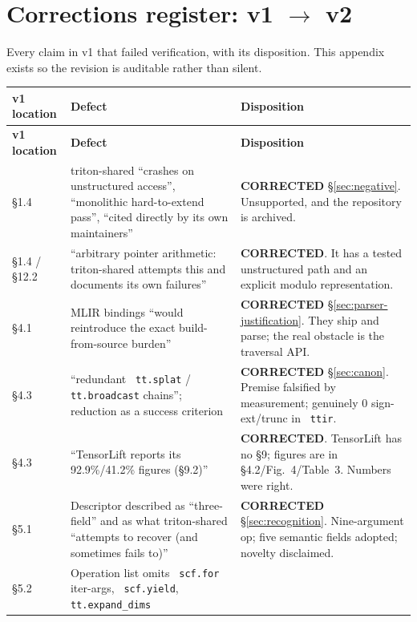\documentclass[11pt,a4paper]{article}
\newcommand{\code}[1]{\texttt{\small\hyphenchar\font=45 #1}}
\begin{document}
\section{Corrections register: v1 $\rightarrow$ v2}\label{app:corrections}

Every claim in v1 that failed verification, with its disposition. This appendix exists so the revision is
auditable rather than silent.

{\footnotesize
\begin{longtable}{@{}>{\raggedright\arraybackslash}p{2.4cm} >{\raggedright\arraybackslash}p{8.7cm} >{\raggedright\arraybackslash}p{4.2cm}@{}}
\toprule
\textbf{v1 location} & \textbf{Defect} & \textbf{Disposition} \\
\midrule
\endfirsthead
\toprule
\textbf{v1 location} & \textbf{Defect} & \textbf{Disposition} \\
\midrule
\endhead
\bottomrule
\endlastfoot
\S1.4 & triton-shared ``crashes on unstructured access'', ``monolithic hard-to-extend pass'',
``cited directly by its own maintainers'' & \textbf{CORRECTED} \S\ref{sec:negative}. Unsupported, and the
repository is archived. \\
\addlinespace
\S1.4 / \S12.2 & ``arbitrary pointer arithmetic: triton-shared attempts this and documents its own
failures'' & \textbf{CORRECTED}. It has a tested unstructured path and an explicit modulo representation. \\
\addlinespace
\S4.1 & MLIR bindings ``would reintroduce the exact build-from-source burden'' & \textbf{CORRECTED}
\S\ref{sec:parser-justification}. They ship and parse; the real obstacle is the traversal API. \\
\addlinespace
\S4.3 & ``redundant \code{tt.splat} / \code{tt.broadcast} chains''; reduction as a success criterion &
\textbf{CORRECTED} \S\ref{sec:canon}. Premise falsified by measurement; genuinely 0 sign-ext/trunc in
\code{ttir}. \\
\addlinespace
\S4.3 & ``TensorLift reports its 92.9\%/41.2\% figures (\S9.2)'' & \textbf{CORRECTED}. TensorLift has no
\S9; figures are in \S4.2/Fig.~4/Table~3. Numbers were right. \\
\addlinespace
\S5.1 & Descriptor described as ``three-field'' and as what triton-shared ``attempts to recover (and
sometimes fails to)'' & \textbf{CORRECTED} \S\ref{sec:recognition}. Nine-argument op; five semantic fields
adopted; novelty disclaimed. \\
\addlinespace
\S5.2 & Operation list omits \code{scf.for} iter-args, \code{scf.yield}, \code{tt.expand\_dims} &

\end{longtable}}
\end{document}
